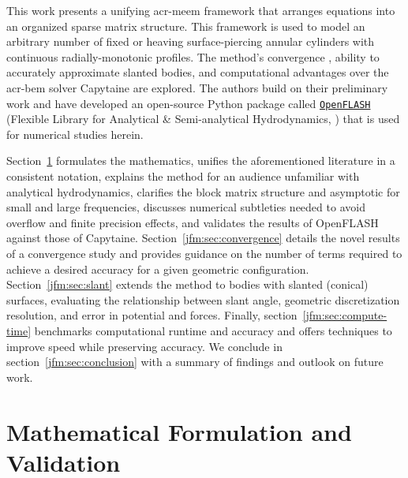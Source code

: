 \documentclass[ASNA,twocolumn]{USG} %
\begin{document}
This work presents a unifying \gls{acr-meem} framework that arranges equations into an organized sparse matrix structure. 
This framework is used to model an arbitrary number of fixed or heaving surface-piercing annular cylinders with continuous radially-monotonic profiles. 
The method’s convergence \behaviour{}, ability to accurately approximate slanted bodies, and computational advantages over the \gls{acr-bem} solver Capytaine are explored. 
The authors build on their preliminary work \citep{mccabe_open-source_2024} and have developed an open-source Python package called \href{https://github.com/symbiotic-engineering/OpenFLASH}{\texttt{OpenFLASH}} (Flexible Library for Analytical \& Semi-analytical Hydrodynamics, \citep{best_openflash_2026,best_openflash-code_2026}) that is used for numerical studies herein.

Section~\ref{jfm:sec:mathematical-formulation} formulates the mathematics, unifies the aforementioned literature in a consistent notation, 
explains the method for an audience unfamiliar with analytical hydrodynamics, clarifies the block matrix structure and asymptotic \behaviour{} for small and large frequencies, discusses numerical subtleties needed to avoid overflow and finite precision effects, and validates the results of OpenFLASH against those of Capytaine.
Section~\ref{jfm:sec:convergence} details the novel results of a convergence study and provides guidance on the number of terms required to achieve a desired accuracy for a given geometric configuration.
Section~\ref{jfm:sec:slant} extends the method to bodies with slanted (conical) surfaces, evaluating the relationship between slant angle, geometric discretization resolution, and error in potential and forces. 
Finally, section~\ref{jfm:sec:compute-time} benchmarks computational runtime and accuracy and offers techniques to improve speed while preserving accuracy.
We conclude in section~\ref{jfm:sec:conclusion} with a summary of findings and outlook on future work.

\section{Mathematical Formulation and Validation}\label{jfm:sec:mathematical-formulation}
\end{document}
